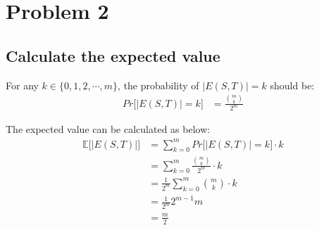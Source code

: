 \documentclass[a4paper, 12pt, titlepage]{article}
\begin{document}
\section{Problem 2}

\subsection{Calculate the expected value }



For any $k \in \{  0, 1, 2, \cdots, m \}$, the probability of $|E(S, T)| = k$ should be:
\begin{equation}
    \begin{aligned}
        Pr \big[ |E(S, T)| = k \big] &= \frac{\binom{m}{k}}{2^{m}}
    \end{aligned}
\end{equation}


The expected value can be calculated as below:
\begin{equation}
    \begin{aligned}
        \mathbb{E} \bigg[| E(S, T) | \bigg] &= \sum_{k = 0}^{m} Pr \big[ | E(S, T) | = k] \cdot k \\
                               &= \sum_{k = 0}^{m} \frac{\binom{m}{k}}{2^{m}} \cdot k  \\
                               &= \frac{1}{2^{m}} \sum_{k = 0}^{m} \binom{m}{k} \cdot k \\
                               &= \frac{1}{2^{m}} 2^{m - 1} m \\
                               &= \frac{m}{2}
    \end{aligned}
\end{equation}
\end{document}
